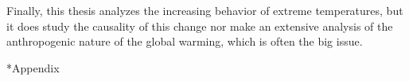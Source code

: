 \documentclass[11pt,a4paper,openany, twosided]{book}
\makeatletter
\renewcommand\part{%
	\if@openright
	\cleardoublepage
	\else
	\clearpage
	\fi
	\thispagestyle{empty}%
	\if@twocolumn
	\onecolumn
	\@tempswatrue
	\else
	\@tempswafalse
	\fi
	\null\vfil
	\secdef\@part\@spart}
\let\origappendix\appendix %
\renewcommand\appendix{\clearpage\pagenumbering{Roman}\origappendix}
\makeatother
\begin{document}
Finally, this thesis analyzes the increasing behavior of extreme temperatures, but it does study the causality of this change nor make an extensive analysis of the anthropogenic nature of the global warming, which is often the big issue.

\thispagestyle{empty}



{}
\part*{Appendix}
\appendix







\setlength{\parindent}{5em}
\setlength{\parskip}{2em}
\renewcommand{\baselinestretch}{4.0}


\end{document}

